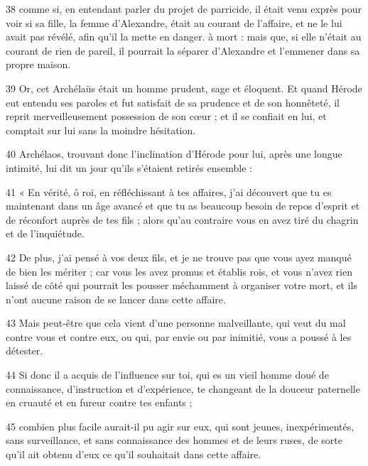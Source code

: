 \par 38 comme si, en entendant parler du projet de parricide, il était venu exprès pour voir si sa fille, la femme d'Alexandre, était au courant de l'affaire, et ne le lui avait pas révélé, afin qu'il la mette en danger. à mort : mais que, si elle n'était au courant de rien de pareil, il pourrait la séparer d'Alexandre et l'emmener dans sa propre maison.

\par 39 Or, cet Archélaüs était un homme prudent, sage et éloquent. Et quand Hérode eut entendu ses paroles et fut satisfait de sa prudence et de son honnêteté, il reprit merveilleusement possession de son cœur ; et il se confiait en lui, et comptait sur lui sans la moindre hésitation.

\par 40 Archélaos, trouvant donc l'inclination d'Hérode pour lui, après une longue intimité, lui dit un jour qu'ils s'étaient retirés ensemble :

\par 41 « En vérité, ô roi, en réfléchissant à tes affaires, j'ai découvert que tu es maintenant dans un âge avancé et que tu as beaucoup besoin de repos d'esprit et de réconfort auprès de tes fils ; alors qu'au contraire vous en avez tiré du chagrin et de l'inquiétude.

\par 42 De plus, j'ai pensé à vos deux fils, et je ne trouve pas que vous ayez manqué de bien les mériter ; car vous les avez promus et établis rois, et vous n'avez rien laissé de côté qui pourrait les pousser méchamment à organiser votre mort, et ils n'ont aucune raison de se lancer dans cette affaire.

\par 43 Mais peut-être que cela vient d'une personne malveillante, qui veut du mal contre vous et contre eux, ou qui, par envie ou par inimitié, vous a poussé à les détester.

\par 44 Si donc il a acquis de l'influence sur toi, qui es un vieil homme doué de connaissance, d'instruction et d'expérience, te changeant de la douceur paternelle en cruauté et en fureur contre tes enfants ;

\par 45 combien plus facile aurait-il pu agir sur eux, qui sont jeunes, inexpérimentés, sans surveillance, et sans connaissance des hommes et de leurs ruses, de sorte qu'il ait obtenu d'eux ce qu'il souhaitait dans cette affaire.

